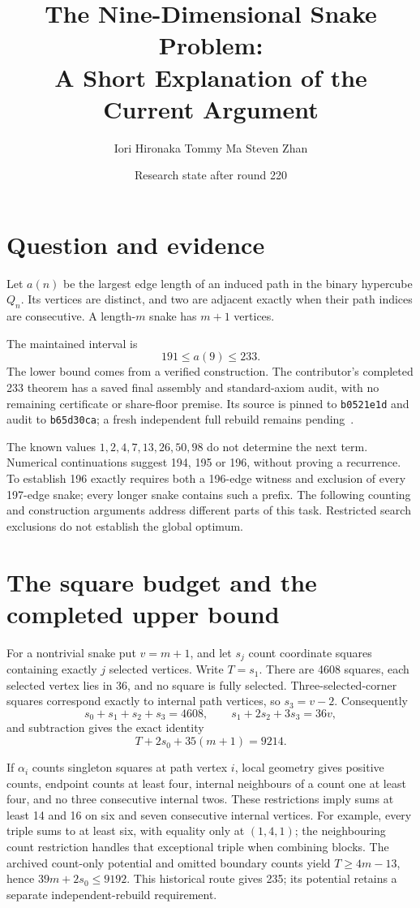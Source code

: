 \documentclass[11pt,a4paper]{article}
\title{The Nine-Dimensional Snake Problem:\\A Short Explanation of the Current Argument}
\author{Iori Hironaka \quad Tommy Ma \quad Steven Zhan}
\date{Research state after round 220}
\begin{document}
\maketitle

\section{Question and evidence}
Let $a(n)$ be the largest edge length of an induced path in the binary
hypercube $Q_n$. Its vertices are distinct, and two are adjacent exactly
when their path indices are consecutive. A length-$m$ snake has $m+1$ vertices.

The maintained interval is
\[
\boxed{191\le a(9)\le233.}
\]
The lower bound comes from a verified construction. The contributor's
completed 233 theorem has a saved final assembly and standard-axiom audit,
with no remaining certificate or share-floor premise. Its source is pinned
to \texttt{b0521e1d} and audit to \texttt{b65d30ca}; a fresh independent
full rebuild remains pending~\cite{bound233archive}.

The known values $1,2,4,7,13,26,50,98$ do not determine the next term.
Numerical continuations suggest 194, 195 or 196, without proving a recurrence.
To establish 196 exactly requires both a 196-edge witness and exclusion
of every 197-edge snake; every longer snake contains such a prefix.
The following counting and construction arguments address different parts
of this task. Restricted search exclusions do not establish the global optimum.

\section{The square budget and the completed upper bound}
For a nontrivial snake put $v=m+1$, and let $s_j$ count coordinate squares
containing exactly $j$ selected vertices. Write $T=s_1$.
There are 4608 squares, each selected vertex lies in 36, and no square
is fully selected. Three-selected-corner squares correspond exactly to
internal path vertices, so $s_3=v-2$. Consequently
\[
s_0+s_1+s_2+s_3=4608,\qquad s_1+2s_2+3s_3=36v,
\]
and subtraction gives the exact identity
\[
\boxed{T+2s_0+35(m+1)=9214.}
\]

If $\alpha_i$ counts singleton squares at path vertex $i$, local geometry
gives positive counts, endpoint counts at least four, internal neighbours
of a count one at least four, and no three consecutive internal twos.
These restrictions imply sums at least 14 and 16 on six and seven
consecutive internal vertices. For example, every triple sums to at least
six, with equality only at $(1,4,1)$; the neighbouring count restriction
handles that exceptional triple when combining blocks.
The archived count-only potential and omitted boundary counts yield
$T\ge4m-13$, hence $39m+2s_0\le9192$. This historical route gives 235;
its potential retains a separate independent-rebuild requirement.
\end{document}
